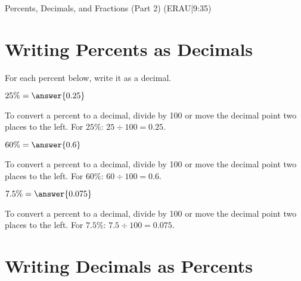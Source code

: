 \documentclass{ximera}
\begin{document}

Percents, Decimals, and Fractions (Part 2) (ERAU|9:35)



\section*{Writing Percents as Decimals}

For each percent below, write it as a decimal.


\begin{problem}
$25\% = \answer{0.25}$

\begin{feedback}
To convert a percent to a decimal, divide by 100 or move the decimal point two places to the left. For $25\%$: $25 \div 100 = 0.25$.
\end{feedback}

\end{problem}

\begin{problem}
$60\% = \answer{0.6}$

\begin{feedback}
To convert a percent to a decimal, divide by 100 or move the decimal point two places to the left. For $60\%$: $60 \div 100 = 0.6$.
\end{feedback}

\end{problem}

\begin{problem}
$7.5\% = \answer{0.075}$

\begin{feedback}
To convert a percent to a decimal, divide by 100 or move the decimal point two places to the left. For $7.5\%$: $7.5 \div 100 = 0.075$.
\end{feedback}

\end{problem}



\section*{Writing Decimals as Percents}
\end{document}

